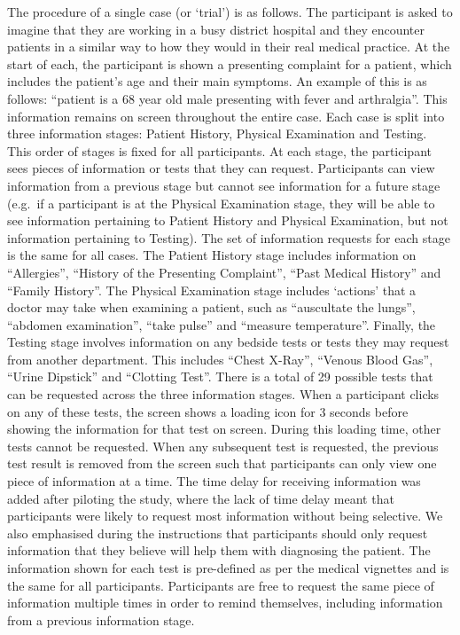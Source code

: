 \documentclass[a4paper, nobind]{templates/ociamthesis}
\begin{document}
The procedure of a single case (or `trial') is as follows. The participant is asked to imagine that they are working in a busy district hospital and they encounter patients in a similar way to how they would in their real medical practice. At the start of each, the participant is shown a presenting complaint for a patient, which includes the patient's age and their main symptoms. An example of this is as follows: ``patient is a 68 year old male presenting with fever and arthralgia''. This information remains on screen throughout the entire case. Each case is split into three information stages: Patient History, Physical Examination and Testing. This order of stages is fixed for all participants. At each stage, the participant sees pieces of information or tests that they can request. Participants can view information from a previous stage but cannot see information for a future stage (e.g.~if a participant is at the Physical Examination stage, they will be able to see information pertaining to Patient History and Physical Examination, but not information pertaining to Testing). The set of information requests for each stage is the same for all cases. The Patient History stage includes information on ``Allergies'', ``History of the Presenting Complaint'', ``Past Medical History'' and ``Family History''. The Physical Examination stage includes `actions' that a doctor may take when examining a patient, such as ``auscultate the lungs'', ``abdomen examination'', ``take pulse'' and ``measure temperature''. Finally, the Testing stage involves information on any bedside tests or tests they may request from another department. This includes ``Chest X-Ray'', ``Venous Blood Gas'', ``Urine Dipstick'' and ``Clotting Test''. There is a total of 29 possible tests that can be requested across the three information stages. When a participant clicks on any of these tests, the screen shows a loading icon for 3 seconds before showing the information for that test on screen. During this loading time, other tests cannot be requested. When any subsequent test is requested, the previous test result is removed from the screen such that participants can only view one piece of information at a time. The time delay for receiving information was added after piloting the study, where the lack of time delay meant that participants were likely to request most information without being selective. We also emphasised during the instructions that participants should only request information that they believe will help them with diagnosing the patient. The information shown for each test is pre-defined as per the medical vignettes and is the same for all participants. Participants are free to request the same piece of information multiple times in order to remind themselves, including information from a previous information stage.
\end{document}
